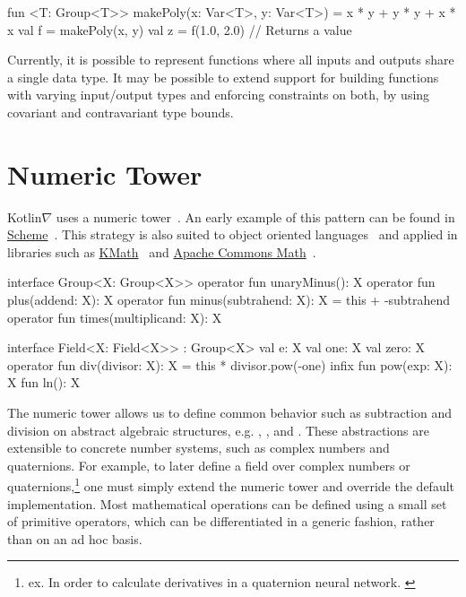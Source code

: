 \begin{kotlinlisting}
fun <T: Group<T>> makePoly(x: Var<T>, y: Var<T>) = x * y + y * y + x * x
val f = makePoly(x, y)
val z = f(1.0, 2.0) // Returns a value
\end{kotlinlisting}
%
Currently, it is possible to represent functions where all inputs and outputs share a single data type. It may be possible to extend support for building functions with varying input/output types and enforcing constraints on both, by using covariant and contravariant type bounds.

\section{Numeric Tower}\label{sec:numeric-tower}

Kotlin$\nabla$ uses a numeric tower~\citep{st2012typing}. An early example of this pattern can be found in \href{https://www.gnu.org/software/guile/manual/html_node/Numerical-Tower.html}{Scheme}~\citep{sperber2009revised}. This strategy is also suited to object oriented languages~\citep{niculescu2003design, niculescu2011using, kennedy2005generalized} and applied in libraries such as \href{https://github.com/mipt-npm/kmath}{KMath}~\citep{nozik2019kmath} and \href{https://commons.apache.org/proper/commons-math/}{Apache Commons Math}~\citep{developers2012apache}.

\begin{kotlinlisting}
interface Group<X: Group<X>> {
    operator fun unaryMinus(): X
    operator fun plus(addend: X): X
    operator fun minus(subtrahend: X): X = this + -subtrahend
    operator fun times(multiplicand: X): X
}

interface Field<X: Field<X>> : Group<X> {
    val e: X
    val one: X
    val zero: X
    operator fun div(divisor: X): X = this * divisor.pow(-one)
    infix fun pow(exp: X): X
    fun ln(): X
}
\end{kotlinlisting}
%
The numeric tower allows us to define common behavior such as subtraction and division on abstract algebraic structures, e.g. , , and . These abstractions are extensible to concrete number systems, such as complex numbers and quaternions. For example, to later define a field over complex numbers or quaternions,\hspace{-.08em}\footnote{ex. In order to calculate derivatives in a quaternion neural network. \citep{isokawa2003quaternion}} one must simply extend the numeric tower and override the default implementation. Most mathematical operations can be defined using a small set of primitive operators, which can be differentiated in a generic fashion, rather than on an ad hoc basis.

